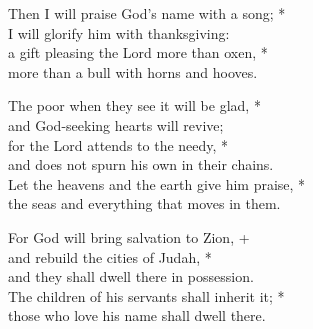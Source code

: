 Then I will praise God's name with a song; *\\
I will glorify him with thanksgiving: \\
a gift pleasing the Lord more than oxen, *\\
more than a bull with horns and hooves. 

The poor when they see it will be glad, *\\
and God-seeking hearts will revive; \\
for the Lord attends to the needy, *\\
and does not spurn his own in their chains. \\
Let the heavens and the earth give him praise, *\\
the seas and everything that moves in them. 

For God will bring salvation to Zion, +\\ 
and rebuild the cities of Judah, *\\
and they shall dwell there in possession. \\
The children of his servants shall inherit it; *\\
those who love his name shall dwell there. 
